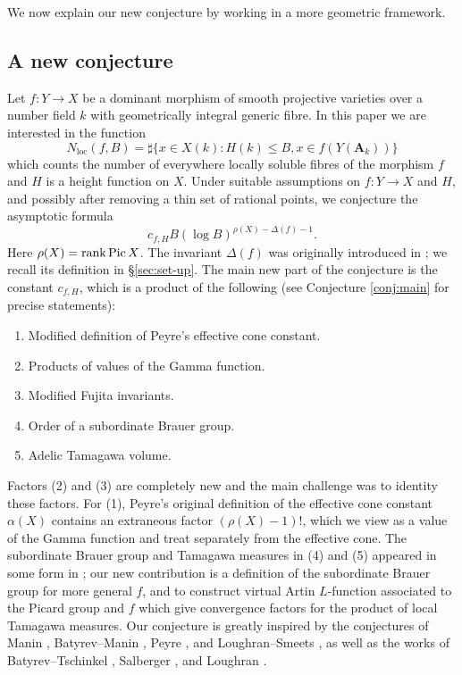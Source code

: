 \documentclass[a4paper,12pt,reqno]{amsart}
\numberwithin{equation}{section} \numberwithin{figure}{section}
\DeclareMathOperator{\Pic}{Pic} \DeclareMathOperator{\Div}{Div}
\newcommand{\Adele}{\mathbf{A}}
\renewcommand{\leq}{\leqslant}
\renewcommand{\#}{\sharp}
\theoremstyle{definition}
\numberwithin{lemma}{section}
\begin{document}
We now explain our new conjecture by working in a more geometric framework.

 
\subsection{A new conjecture}
Let $f:Y \to X$ be a dominant morphism of smooth projective varieties over a number field $k$ with geometrically integral generic fibre.
In this paper we are interested in the function
$$N_{\textrm{loc}}(f,B) =  \#\{ x \in X(k) : H(k) \leq B, x \in f(Y(\Adele_k))\}$$
which counts the number of everywhere locally soluble fibres of the morphism $f$ and $H$ is a height function on $X$.
Under suitable assumptions on $f: Y \to X$ and $H$, and possibly after removing a thin set of rational points, we conjecture the asymptotic formula
\begin{equation} \label{eqn:conj_intro}
	c_{f,H} B (\log B)^{\rho(X) - \Delta(f) - 1}.
\end{equation}
Here $\rho(X) = \rank \Pic X$. The invariant $\Delta(f)$ was originally introduced in \cite{LS16}; we recall its definition in \S \ref{sec:set-up}. The main new part of the conjecture is the constant $c_{f,H}$, which is a product of the following (see Conjecture \ref{conj:main} for precise statements):

\begin{enumerate}
	\item Modified definition of Peyre's effective cone constant.
	\item Products of values of the Gamma function.
	\item Modified Fujita invariants.
	\item Order of a subordinate Brauer group.
	\item Adelic Tamagawa volume.
\end{enumerate}


Factors (2) and (3) are completely new and the main challenge was to  identity these factors. For (1), Peyre's original definition \cite[Def.~2.4]{Pey95} of the effective cone constant $\alpha(X)$ contains an extraneous factor $(\rho(X) - 1)!$, which we view as a value of the Gamma function and treat separately from the effective cone. The subordinate Brauer group and Tamagawa measures in (4) and (5) appeared in some form in \cite{Lou18}; our new contribution is a definition of the subordinate Brauer group for more general $f$, and to construct virtual Artin $L$-function associated to the  Picard group and $f$ which give convergence factors for the product of local Tamagawa measures. 
Our conjecture is greatly inspired by the conjectures of Manin \cite{FMT89}, Batyrev--Manin \cite{BM90}, Peyre \cite{Pey95}, and Loughran--Smeets \cite{LS16}, as well as the works of Batyrev--Tschinkel \cite{BT95}, Salberger \cite{Sal98}, and Loughran \cite{Lou18}. 
\end{document}
